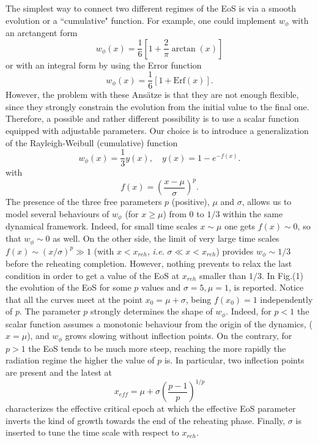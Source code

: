 \documentclass[%
aps,prd,nofootinbib,showkeys,a4paper,10pt
]{revtex4-2}
\begin{document}
The simplest way to connect two different regimes of the EoS is via a smooth evolution or a ``cumulative" function.
For example, one could implement $w_{\phi}$ with an arctangent form
\begin{equation}
w_{\phi}(x)=\frac{1}{6}\left[ 1 + \frac{2}{\pi}\arctan(x) \right]
\end{equation}
or with an integral form by using the Error function
\begin{equation}
w_{\phi}(x)=\frac{1}{6}\left[ 1 + \mbox{Erf}(x)\right] .
\end{equation}
However, the problem with these Ans\"atze is that they are not enough flexible, since they strongly constrain the evolution from the initial value to the final one.
Therefore, a possible and rather different possibility is to use a scalar function equipped with adjustable parameters.
Our choice is to introduce a generalization of the Rayleigh-Weibull (cumulative) function \cite{50}
\begin{equation}\label{eqn: w}
w_{\phi}(x)=\frac{1}{3}y(x), \quad y(x)= 1 - e^{-f(x)} . 
\end{equation}
with
\begin{equation}
f(x)=\left(\frac{x-\mu}{\sigma}\right)^p.
\end{equation}
The presence of the three free parameters $p$ (positive), $\mu$ and $\sigma$,
allows us to model several behaviours of $w_{\phi}$ (for $x\geq \mu$) from $0$ to $1/3$ within the same dynamical framework.
Indeed, for small time scales $x\sim \mu$ one gets $f(x)\sim 0$, so that $w_{\phi}\sim 0$ as well.
On the other side, the limit of very large time scales $f(x)\sim (x/\sigma)^p \gg 1$ (with $x<x_{reh}$, {\it i.e.} $\sigma \ll x <  x_{reh}$)  
provides $w_{\phi}\sim 1/3$ before the reheating completion.
However, nothing prevents to relax the last condition in order to get a value of the EoS at $x_{reh}$ smaller than $1/3$.
In Fig.(1) the evolution of the EoS for some $p$ values and $\sigma=5, \mu=1$, is reported.  
Notice that all the curves meet at the point $x_0= \mu + \sigma$, being $f(x_0)=1$ independently of $p$. The parameter $p$ strongly determines the shape of $w_{\phi}$.
Indeed, for $p<1$ the scalar function assumes a monotonic behaviour 
from the origin of the dynamics, ($x=\mu$), and $w_{\phi}$ grows slowing without inflection points.  
On the contrary, for $p>1$ the EoS tends to be much more steep, reaching the more rapidly the radiation regime the higher the value of $p$ is. 
In particular, two inflection points are present and the latest at
\begin{equation}\label{eqn: inflection point}
x_{eff}=\mu +\sigma\left(\frac{p-1}{p}\right)^{1/p}
\end{equation} 
characterizes the effective critical epoch at which the effective EoS parameter inverts the kind of growth towards the end of the reheating phase.  
Finally, $\sigma$ is inserted to tune the time scale with respect to $x_{reh}$.
\end{document}
